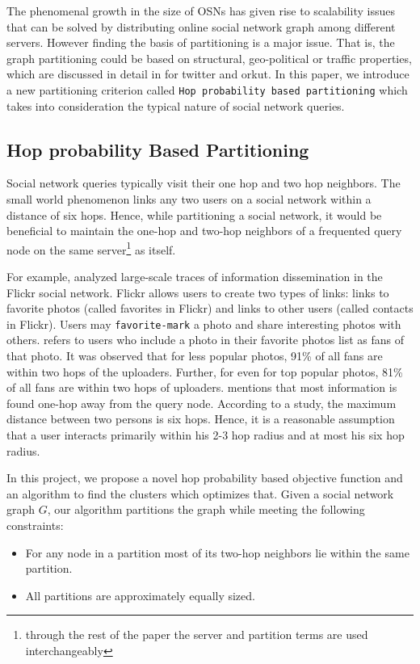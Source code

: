 \documentclass[letterpaper]{article}
\begin{document}
    The phenomenal growth in the size of OSNs has given rise to scalability
issues that can be solved by distributing online social network graph among
different servers. However finding the basis of partitioning  is a major issue. That
is, the graph partitioning could be based on structural, geo-political or
traffic properties, which are discussed in detail in \cite{arxviv} for twitter
and orkut. In this paper, we introduce a new partitioning criterion called
\texttt{Hop probability based partitioning} which takes into consideration the typical
nature of social network queries.

\subsection{Hop probability Based Partitioning}

Social network queries typically visit their one hop and two hop neighbors. The
small world phenomenon links any two users on a social network within a distance
of six hops. Hence, while partitioning a social network, it would be beneficial
to maintain the one-hop and two-hop neighbors of a frequented query node on the
same server\footnote{through the rest of the paper the server and partition
terms are used interchangeably} as itself.  

For example, \cite{flickr} analyzed large-scale traces of information
dissemination in the Flickr social network. Flickr allows users to create two
types of links: links to favorite photos (called favorites in Flickr) and links
to other users (called contacts in Flickr). Users may \texttt{favorite-mark} a
photo and share interesting photos with others. \cite{flickr} refers to users
who include a photo in their favorite photos list as fans of that photo. It was
observed that for less popular photos, 91\% of all fans are within two hops of
the uploaders. Further, for even for top popular photos, 81\% of all fans are
within two hops of uploaders. \cite{OHM} mentions that most information is
found one-hop away from the query node. According to a study\cite{4}, the
maximum distance between two persons is six hops. Hence, it is a reasonable
assumption that a user interacts primarily within his 2-3 hop radius and at
most his six hop radius.

    In this project, we propose a novel hop probability based objective function
and  an algorithm to find the clusters which optimizes that. Given a social
network graph $G$, our algorithm partitions the graph while meeting the
following constraints:
\begin{itemize}
\item For any node in a partition most of its two-hop neighbors lie within the same partition.
\item All partitions are approximately equally sized.
\end{itemize} 
\end{document}
